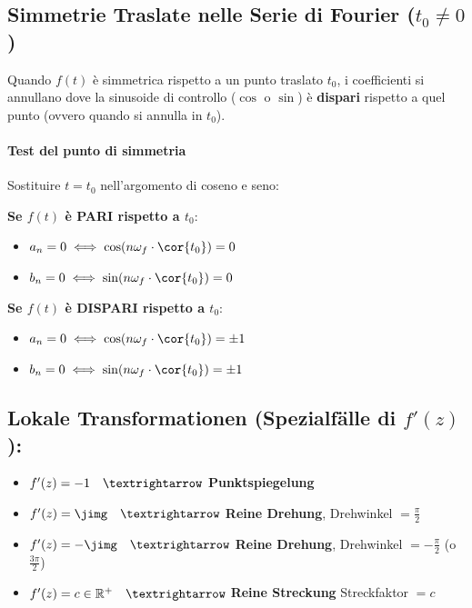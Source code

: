 \subsection*{Simmetrie Traslate nelle Serie di Fourier ($t_0 \neq 0$)}
Quando $f(t)$ è simmetrica rispetto a un punto traslato $t_0$, i coefficienti si annullano dove la sinusoide di controllo ($\cos$ o $\sin$) è \textbf{dispari} rispetto a quel punto (ovvero quando si annulla in $t_0$).

\smallbreak

\paragraph{Test del punto di simmetria}
Sostituire $t = t_0$ nell'argomento di coseno e seno:\smallbreak

\begin{minipage}{0.45\columnwidth}
    \textbf{Se $f(t)$ è PARI rispetto a $t_0$}:
    \begin{itemize}
        \item $a_n = 0 \iff \cos(n\omega_f \cdot \cor{t_0}) = 0$
        \item $b_n = 0 \iff \sin(n\omega_f \cdot \cor{t_0}) = 0$
    \end{itemize}
\end{minipage}\hfill
\begin{minipage}{0.45\columnwidth}
    \textbf{Se $f(t)$ è DISPARI rispetto a $t_0$}:
    \begin{itemize}
        \item $a_n = 0 \iff \cos(n\omega_f \cdot \cor{t_0}) = \pm 1$ 
        \item $b_n = 0 \iff \sin(n\omega_f \cdot \cor{t_0}) = \pm 1$ 
    \end{itemize}
\end{minipage}

\subsection[Lokale Transformationen]{Lokale Transformationen (Spezialfälle di $f'(z)$):}
\label{chap:lokale_transformationen}
\begin{itemize}
    \item $f'(z) = -1 \quad \textrightarrow$ \textbf{Punktspiegelung} 
    \item $f'(z) = \jimg \quad \textrightarrow$ \textbf{Reine Drehung}, Drehwinkel $= \frac{\pi}{2}$
    \item $f'(z) = -\jimg \quad \textrightarrow$ \textbf{Reine Drehung}, Drehwinkel $= -\frac{\pi}{2}$ (o $\frac{3\pi}{2}$)
    \item $f'(z) = c \in \mathbb{R}^+ \quad \textrightarrow$ \textbf{Reine Streckung} Streckfaktor $= c$
\end{itemize}

